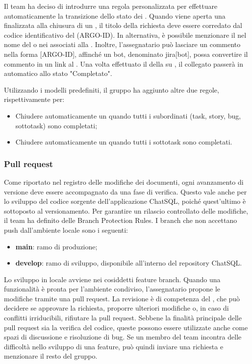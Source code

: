 \vspace{0.5\baselineskip}
\par Il team ha deciso di introdurre una regola personalizzata per effettuare automaticamente la transizione dello stato dei . Quando viene aperta una  finalizzata alla chiusura di un , il titolo della richiesta deve essere corredato dal codice identificativo del  (ARGO-ID). In alternativa, è possibile menzionare il  nel nome del  o nei  associati alla . Inoltre, l’assegnatario può lasciare un commento nella forma [ARGO-ID], affinché un bot, denominato jira[bot], possa convertire il commento in un link al  . Una volta effettuato il  della  su , il  collegato passerà in automatico allo stato "Completato".
\par Utilizzando i modelli predefiniti, il gruppo ha aggiunto altre due regole, rispettivamente per:
\begin{itemize}
  \item Chiudere automaticamente un  quando tutti i  subordinati (task, story, bug, sottotask) sono completati;
  \item Chiudere automaticamente un  quando tutti i sottotask sono completati.
\end{itemize}

\subsubsection{Pull request} \label{sec:pull_request}
Come riportato nel registro delle modifiche dei documenti, ogni avanzamento di versione deve essere accompagnato da una fase di verifica. Questo vale anche per lo sviluppo del codice sorgente dell'applicazione ChatSQL, poiché quest'ultimo è sottoposto al versionamento. Per garantire un rilascio controllato delle modifiche, il team ha definito delle Branch Protection Rules. I branch che non accettano push dall’ambiente locale sono i seguenti:
\begin{itemize}
  \item \textbf{main}: ramo di produzione;
  \item \textbf{develop}: ramo di sviluppo, disponibile all'interno del repository ChatSQL.
\end{itemize}
\par Lo sviluppo in locale avviene nei cosiddetti feature branch. Quando una funzionalità è pronta per l'ambiente condiviso, l'assegnatario propone le modifiche tramite una pull request. La revisione è di competenza del \Verificatore{}, che può decidere se approvare la richiesta, proporre ulteriori modifiche o, in caso di conflitti irriducibili, rifiutare la pull request. Sebbene la finalità principale delle pull request sia la verifica del codice, queste possono essere utilizzate anche come spazi di discussione e risoluzione di bug. Se un membro del team incontra delle difficoltà nello sviluppo di una feature, può quindi inviare una richiesta e menzionare il resto del gruppo.


